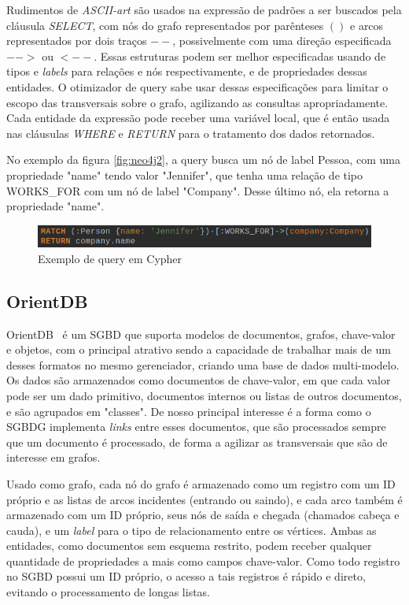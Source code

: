 \documentclass[conference]{IEEEtran}
\begin{document}
Rudimentos de \emph{ASCII-art} são usados na expressão de padrões a ser buscados pela cláusula \emph{SELECT}, com nós do grafo representados por parênteses $()$ e arcos representados por dois traços $--$, possivelmente com uma direção especificada $-->$ ou $<--$. Essas estruturas podem ser melhor especificadas usando de tipos e \emph{labels} para relações e nós respectivamente, e de propriedades dessas entidades. O otimizador de query sabe usar dessas especificações para limitar o escopo das transversais sobre o grafo, agilizando as consultas apropriadamente. Cada entidade da expressão pode receber uma variável local, que é então usada nas cláusulas \emph{WHERE} e \emph{RETURN} para o tratamento dos dados retornados.

No exemplo da figura \ref{fig:neo4j2}, a query busca um nó de label Pessoa, com uma propriedade "name" tendo valor "Jennifer", que tenha uma relação de tipo WORKS\_FOR com um nó de label "Company". Desse último nó, ela retorna a propriedade "name".

\begin{figure}[htbp]
\centerline{\includegraphics[width=0.9\linewidth]{img/neo4j/neo4j_ps2.png}}
\caption{Exemplo de query em Cypher}\label{fig:neo4j2}
\label{fig}
\end{figure}

\subsection{OrientDB}

OrientDB~\cite{orientdb} é um SGBD que suporta modelos de documentos, grafos, chave-valor e objetos, com o principal atrativo sendo a capacidade de trabalhar mais de um desses formatos no mesmo gerenciador, criando uma base de dados multi-modelo. Os dados são armazenados como documentos de chave-valor, em que cada valor pode ser um dado primitivo, documentos internos ou listas de outros documentos, e são agrupados em "classes". De nosso principal interesse é a forma como o SGBDG implementa \emph{links} entre esses documentos, que são processados sempre que um documento é processado, de forma a agilizar as transversais que são de interesse em grafos.

Usado como grafo, cada nó do grafo é armazenado como um registro com um ID próprio e as listas de arcos incidentes (entrando ou saindo), e cada arco também é armazenado com um ID próprio, seus nós de saída e chegada (chamados cabeça e cauda), e um \emph{label} para o tipo de relacionamento entre os vértices. Ambas as entidades, como documentos sem esquema restrito, podem receber qualquer quantidade de propriedades a mais como campos chave-valor. Como todo registro no SGBD possui um ID próprio, o acesso a tais registros é rápido e direto, evitando o processamento de longas listas.
\end{document}
